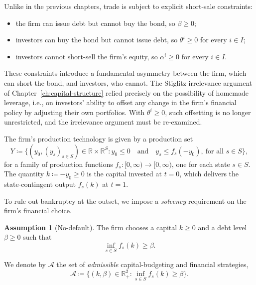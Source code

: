 \documentclass[11pt,a4paper,oneside]{book}
\def\R{\mathbb{R}}
\def\leq{\leqslant}
\def\geq{\geqslant}
\def\et{\quad \text{and} \quad}
\theoremstyle{plain}
\theoremstyle{definition}
\newtheorem{assumption}[theorem]{Assumption}
\theoremstyle{remark}
\numberwithin{equation}{chapter}
\begin{document}
Unlike in the previous chapters, trade is subject to explicit short-sale constraints:
\begin{itemize}
  \item the firm can issue debt but cannot buy the bond, so $\beta \geq 0$;
  \item investors can buy the bond but cannot issue debt, so $\theta^i \geq 0$ for every $i \in I$;
  \item investors cannot short-sell the firm's equity, so $\alpha^i \geq 0$ for every $i \in I$.
\end{itemize}
These constraints introduce a fundamental asymmetry between the firm, which can short the bond, and investors, who cannot.
The Stiglitz irrelevance argument of Chapter~\ref{ch:capital-structure} relied precisely on the possibility of homemade leverage, i.e., on investors' ability to offset any change in the firm's financial policy by adjusting their own portfolios.
With $\theta^i \geq 0$, such offsetting is no longer unrestricted, and the irrelevance argument must be re-examined.

The firm's production technology is given by a production set
\begin{equation}\label{eq:Y-BGR}
  Y \coloneqq \bigl\{ (y_0, (y_s)_{s \in S}) \in \R \times \R^S \colon y_0 \leq 0 \et y_s \leq f_s(-y_0), \ \text{for all $s\in S$} \bigr\},
\end{equation}
for a family of production functions $f_s : [0, \infty) \to [0, \infty)$, one for each state $s \in S$.
The quantity $k \coloneqq - y_0 \geq 0$ is the capital invested at $t=0$, which delivers the state-contingent output $f_s(k)$ at $t=1$.

To rule out bankruptcy at the outset, we impose a \emph{solvency} requirement on the firm's financial choice.

\begin{assumption}[No-default]\label{ass:no-default}
The firm chooses a capital $k \geq 0$ and a debt level $\beta \geq 0$ such that
\begin{equation*}
  \inf_{s \in S} f_s(k) \geq \beta.
\end{equation*}
\end{assumption}

We denote by $\mathcal{A}$ the set of \emph{admissible} capital-budgeting and financial strategies,
\begin{equation}\label{eq:admissible-set}
  \mathcal{A} \coloneqq \bigl\{ (k, \beta) \in \R_+^2 \colon \inf_{s \in S} f_s(k) \geq \beta \bigr\}.
\end{equation}
\end{document}
